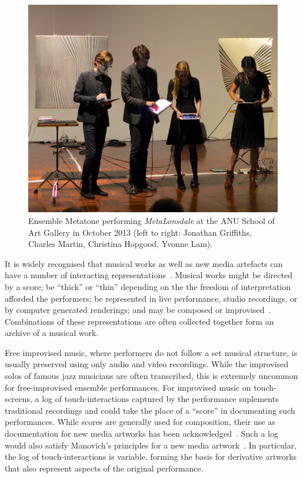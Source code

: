 \documentclass[graybox]{svmult}
\begin{document}
\begin{figure}
  \centering
  \includegraphics[width=\textwidth]{figures/ensemblemetatone}
  \caption{Ensemble Metatone performing \emph{MetaLonsdale} at the ANU
    School of Art Gallery in October 2013 (left to right: Jonathan
    Griffiths, Charles Martin, Christina Hopgood, Yvonne Lam).}
  \label{ensemblemetatoneperforming}
\end{figure}

It is widely recognised that musical works as well as new media
artefacts can have a number of interacting
representations~\cite{Rinehart:2007pi}. Musical works might be
directed by a score; be ``thick'' or ``thin'' depending on the the
freedom of interpretation afforded the performers; be represented in
live performance, studio recordings, or by computer generated
renderings; and may be composed or improvised~\cite{Davies:2005fj}.
Combinations of these representations are often collected together
form an archive of a musical work.

Free improvised music, where performers do not follow a set musical
structure, is usually preserved using only audio and video recordings.
While the improvised solos of famous jazz musicians are often
transcribed, this is extremely uncommon for free-improvised ensemble
performances. For improvised music on touch-screens, a log of
touch-interactions captured by the performance suplements traditional
recordings and could take the place of a ``score'' in documenting such
performances. While scores are generally used for composition, their
use as documentation for new media artworks has been
acknowledged~\cite{MacDonald:2009ve}. Such a log would also satisfy
Manovich's principles for a new media artwork~\cite{Manovich:2002ly}.
In particular, the log of touch-interactions is variable, forming the
basis for derivative artworks that also represent aspects of the
original performance.
\end{document}
